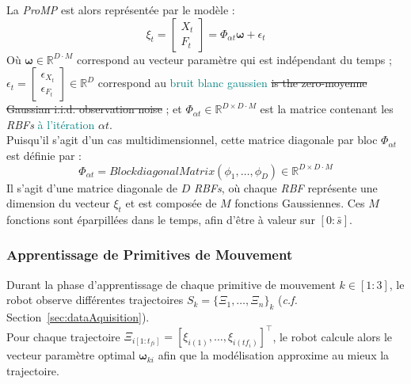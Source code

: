 \documentclass[utf8]{frontiersSCNS} %
\newcommand{\toimprove}[1]{\textcolor{teal}{#1}}
\begin{document}
La \textit{ProMP} est alors représentée par le modèle :
$$\xi_t = \begin{bmatrix} X_t \\ F_t\end{bmatrix} = \Phi_{\alpha t} \boldsymbol{\omega} + \epsilon_t$$
Où $\boldsymbol{\omega} \in  \mathbb{R}^{D \cdot M}$ correspond au vecteur paramètre qui est indépendant du temps ; $\epsilon_t= \begin{bmatrix} \epsilon_{X_t} \\ \epsilon_{F_t}\end{bmatrix} \in \mathbb{R}^D$ correspond au \toimprove{bruit blanc gaussien} \sout{is the zero-moyenne Gaussian i.i.d. observation noise} ; et $\Phi_{\alpha t} \in \mathbb{R}^{D \times D \cdot M}$ est la matrice contenant les \textit{RBFs} \toimprove{à l'itération} $\alpha t$.\\
Puisqu'il s'agit d'un cas multidimensionnel, cette matrice diagonale par bloc $\Phi_{\alpha t}$ est définie par :
$$\Phi_{\alpha t}  = BlockdiagonalMatrix(\phi_1,\ldots,\phi_{D}) \in \mathbb{R}^{D \times D \cdot M} $$
Il s'agit d'une matrice diagonale de $D$ \textit{RBFs}, où chaque  \textit{RBF} représente une dimension du vecteur $\xi_t$ et est composée de $M$ fonctions Gaussiennes. Ces $M$ fonctions sont éparpillées dans le temps, afin d'être à valeur sur $[0: \bar{s}]$.


\subsubsection{Apprentissage de Primitives de Mouvement}
\label{learning}

Durant la phase d'apprentissage de chaque primitive de mouvement $k \in [1:3]$, le robot observe différentes trajectoires $S_k = \{\Xi_1,\ldots, \Xi_n\}_k$ (\textit{c.f.} Section~\ref{sec:dataAquisition}).\\
Pour chaque trajectoire $\Xi_{i {[1:t_{fi}]}} = [\xi_{i(1)}, \ldots, \xi_{i(tf_i)}]^\top$, le robot calcule alors le vecteur paramètre optimal $\boldsymbol{\omega}_{ki}$ afin que la modélisation approxime au mieux la trajectoire.
\end{document}
